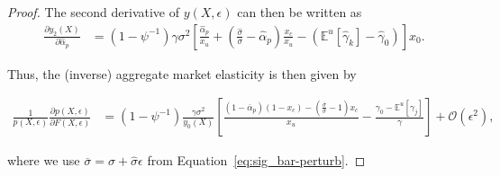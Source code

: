 \begin{proof}
	The second derivative of $y(X,\epsilon)$ can then be written as
	\begin{align}
	\frac{\partial y_2(X)}{\partial \hat{\alpha}_p}   &=\left(1-\psi^{-1}\right) \gamma \sigma^2 \left[\frac{\hat{\alpha}_p}{x_u}+ \left(\frac{\hat{\sigma}}{\sigma} - \hat{\alpha}_p \right)\frac{x_c}{x_u}- (\mathbb{E}^u[\hat{\gamma}_k]-\hat{\gamma}_0) \right] x_0. \nonumber 
	\end{align}
	
	Thus, the (inverse) aggregate market elasticity is then given by
	\begin{small}
		\begin{align}
		\frac{1}{p(X, \epsilon)} \frac{\partial p(X, \epsilon)}{\partial F(X, \epsilon)}
	&=  \left(1-\psi^{-1}\right)\frac{\gamma \sigma^2}{y_0(X)} \left[ \frac{(1-\overline{\alpha}_p)(1-x_c)-\left( \frac{\overline{\sigma}}{\sigma} -1\right)x_c}{x_u} - \frac{\gamma_0-\mathbb{E}^u\left[\gamma_j \right]}{\gamma}\right]+ \mathcal{O}(\epsilon^2),
		\end{align}
	\end{small}
where we use $ \overline{\sigma}=\sigma+\hat{\sigma}\epsilon $ from Equation~\eqref{eq:sig_bar-perturb}.
\end{proof}

%
%


